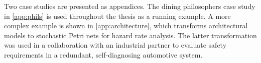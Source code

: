 Two case studies are presented as appendices. The dining philosophers case study in \cref{app:phils} is used throughout the thesis as a running example. A more complex example is shown in \cref{app:architecture}, which transforms architectural models to stochastic Petri nets for hazard rate analysis. The latter transformation was used in a collaboration with an industrial partner to evaluate safety requirements in a redundant, self-diagnosing automotive system.


